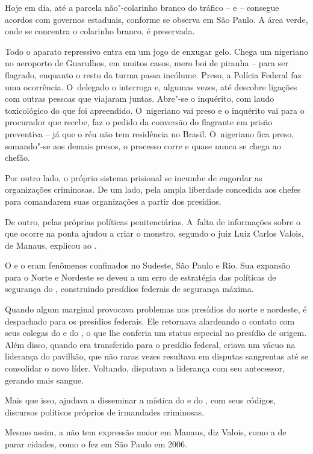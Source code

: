 Hoje em dia, até a parcela não"-colarinho branco do tráfico --  e 
-- consegue acordos com governos estaduais, conforme se observa em São
Paulo. A área verde, onde se concentra o colarinho branco, é preservada.

Todo o aparato repressivo entra em um jogo de enxugar gelo. Chega um
nigeriano no aeroporto de Guarulhos, em muitos casos, mero boi de
piranha -- para ser flagrado, enquanto o resto da turma passa incólume.
Preso, a Polícia Federal faz uma ocorrência. O~delegado o interroga e,
algumas vezes, até descobre ligações com outras pessoas que viajaram
juntas. Abre"-se o inquérito, com laudo toxicológico do que foi
apreendido. O~nigeriano vai preso e o inquérito vai para o procurador
que recebe, faz o pedido da conversão do flagrante em prisão preventiva
-- já que o réu não tem residência no Brasil. O~nigeriano fica preso,
somando"-se aos demais presos, o processo corre e quase nunca se chega ao
chefão.

Por outro lado, o próprio sistema prisional se incumbe de engordar as
organizações criminosas. De um lado, pela ampla liberdade concedida aos
chefes para comandarem suas organizações a partir dos presídios.

De outro, pelas próprias políticas penitenciárias. A~falta de
informações sobre o que ocorre na ponta ajudou a criar o monstro,
segundo o juiz Luiz Carlos Valois, de Manaus, explicou ao .

O  e o  eram fenômenos confinados no Sudeste, São Paulo e Rio. Sua
expansão para o Norte e Nordeste se deveu a um erro de estratégia das
políticas de segurança do , construindo presídios federais de
segurança máxima.

Quando algum marginal provocava problemas nos presídios do norte e
nordeste, é despachado para os presídios federais. Ele retornava
alardeando o contato com seus colegas do  e do , o que lhe conferia
um status especial no presídio de origem. Além disso, quando era
transferido para o presídio federal, criava um vácuo na liderança do
pavilhão, que não raras vezes resultava em disputas sangrentas até se
consolidar o novo líder. Voltando, disputava a liderança com seu
antecessor, gerando mais sangue.

Mais que isso, ajudava a disseminar a mística do  e do , com seus
códigos, discursos políticos próprios de irmandades criminosas.

Mesmo assim, a  não tem expressão maior em Manaus, diz Valois, como a
de parar cidades, como o  fez em São Paulo em 2006.


